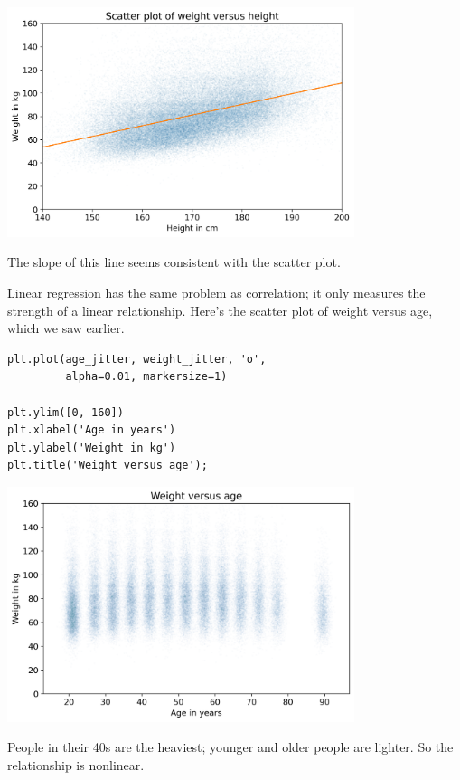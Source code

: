 \begin{center}
\includegraphics[width=4in]{chapters/09_relationships_files/09_relationships_100_0.png}
\end{center}

The slope of this line seems consistent with the scatter plot.

Linear regression has the same problem as correlation; it only measures
the strength of a linear relationship. Here's the scatter plot of weight
versus age, which we saw earlier.

\begin{lstlisting}[]
plt.plot(age_jitter, weight_jitter, 'o', 
         alpha=0.01, markersize=1)

plt.ylim([0, 160])
plt.xlabel('Age in years')
plt.ylabel('Weight in kg')
plt.title('Weight versus age');
\end{lstlisting}

\begin{center}
\includegraphics[width=4in]{chapters/09_relationships_files/09_relationships_102_0.png}
\end{center}

People in their 40s are the heaviest; younger and older people are
lighter. So the relationship is nonlinear.

